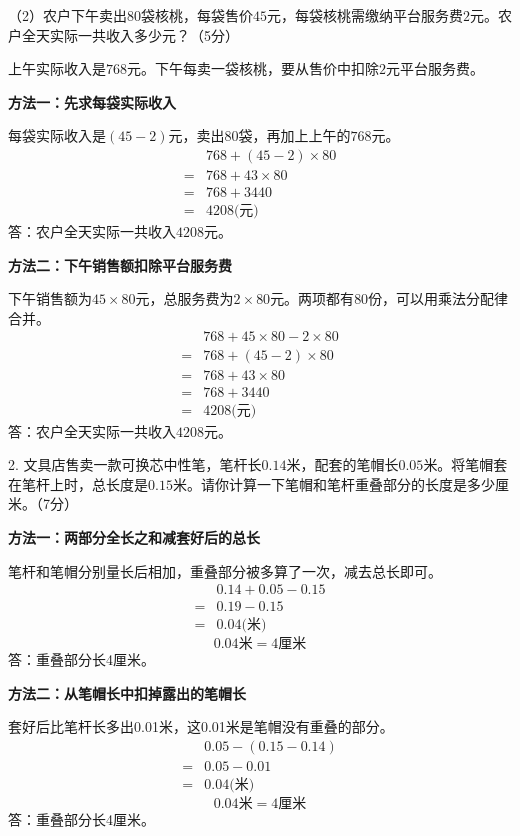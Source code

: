 （2）农户下午卖出\(80\)袋核桃，每袋售价\(45\)元，每袋核桃需缴纳平台服务费\(2\)元。农户全天实际一共收入多少元？（5分）\par
\begin{BookAnswer}
上午实际收入是\(768\)元。下午每卖一袋核桃，要从售价中扣除\(2\)元平台服务费。\par
\textbf{方法一：先求每袋实际收入}\par
每袋实际收入是\((45-2)\)元，卖出\(80\)袋，再加上上午的\(768\)元。
\[
\begin{aligned}
&768+(45-2)\times80\\
={}&768+43\times80\\
={}&768+3440\\
={}&4208\text{(元)}
\end{aligned}
\]
答：农户全天实际一共收入\(4208\)元。\par
\textbf{方法二：下午销售额扣除平台服务费}\par
下午销售额为\(45\times80\)元，总服务费为\(2\times80\)元。两项都有\(80\)份，可以用乘法分配律合并。
\[
\begin{aligned}
&768+45\times80-2\times80\\
={}&768+(45-2)\times80\\
={}&768+43\times80\\
={}&768+3440\\
={}&4208\text{(元)}
\end{aligned}
\]
答：农户全天实际一共收入\(4208\)元。
\end{BookAnswer}

2. 文具店售卖一款可换芯中性笔，笔杆长\(0.14\)米，配套的笔帽长\(0.05\)米。将笔帽套在笔杆上时，总长度是\(0.15\)米。请你计算一下笔帽和笔杆重叠部分的长度是多少厘米。（7分）\par
{}
\begin{BookAnswer}
\textbf{方法一：两部分全长之和减套好后的总长}\par 笔杆和笔帽分别量长后相加，重叠部分被多算了一次，减去总长即可。\[\begin{aligned} &0.14+0.05-0.15\\ ={}&0.19-0.15\\ ={}&0.04\text{(米)}\end{aligned}\]\[0.04\text{米}=4\text{厘米}\]答：重叠部分长4厘米。\par \textbf{方法二：从笔帽长中扣掉露出的笔帽长}\par 套好后比笔杆长多出0.01米，这0.01米是笔帽没有重叠的部分。\[\begin{aligned} &0.05-(0.15-0.14)\\ ={}&0.05-0.01\\ ={}&0.04\text{(米)}\end{aligned}\]\[0.04\text{米}=4\text{厘米}\]答：重叠部分长4厘米。\par
\end{BookAnswer}

